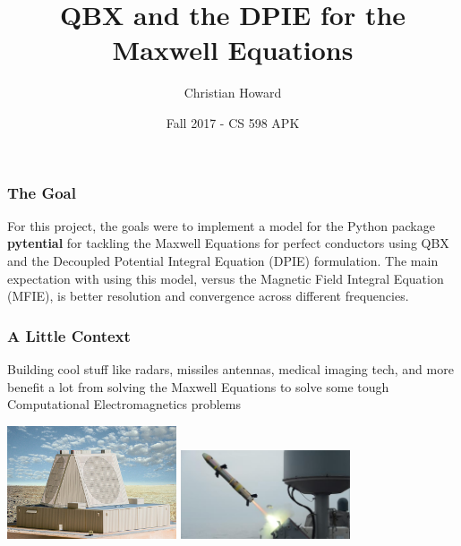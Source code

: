 \documentclass{beamer}
\title{QBX and the DPIE for the Maxwell Equations}
\author{Christian Howard}
\institute{University of Illinois @ Urbana-Champaign}
\date{Fall 2017 - CS 598 APK}
\begin{document}
	
	\frame{\titlepage}
	
	\begin{frame}
	\frametitle{The Goal}
	For this project, the goals were to implement a model for the Python package \textbf{pytential} for tackling the Maxwell Equations for perfect conductors using QBX and the Decoupled Potential Integral Equation (DPIE) formulation. The main expectation with using this model, versus the Magnetic Field Integral Equation (MFIE), is better resolution and convergence across different frequencies.
	
	
\end{frame}
	
	\begin{frame}
	\frametitle{A Little Context}
	Building cool stuff like radars, missiles antennas, medical imaging tech, and more benefit a lot from solving the Maxwell Equations to solve some tough Computational Electromagnetics problems
	
	\vspace{0.5in}
	\hfil\hfil\includegraphics[width=5cm,frame]{raytheonRadar}\hfil\hfil
	\includegraphics[width=5cm,frame]{griffinMissile}\newline
	\null\hfil\hfil{}
	\hfil\hfil{}
	
	\end{frame}
\end{document}
